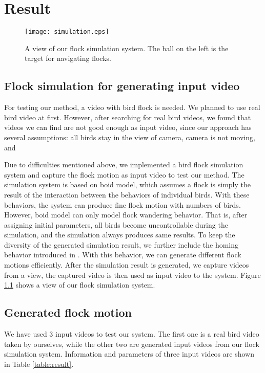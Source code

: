 \chapter{Result}


\begin{figure}[h]
 \begin{center}
  \texttt{[image: simulation.eps]}
 \end{center}
 \caption{A view of our flock simulation system. The ball on the left is the target for navigating flocks.}
 \label{figure:simulation}
\end{figure}


\section{Flock simulation for generating input video}


For testing our method, a video with bird flock is needed. We planned to use real bird video at first. However, after searching for real bird videos, we found that videos we can find are not good enough as input video, since our approach has several assumptions: all birds stay in the view of camera, camera is not moving, and 


Due to difficulties mentioned above, we implemented a bird flock simulation system and capture the flock motion as input video to test our method. The simulation system is based on boid model, which assumes a flock is simply the result of the interaction between the behaviors of individual birds. With these behaviors, the system can produce fine flock motion with numbers of birds. However, boid model can only model flock wandering behavior. That is, after assigning initial parameters, all birds become uncontrollable during the simulation, and the simulation always produces same results. To keep the diversity of the generated simulation result, we further include the homing behavior introduced in \cite{Shape,OB1}. With this behavior, we can generate different flock motions efficiently. After the simulation result is generated, we capture videos from a view, the captured video is then used as input video to the system. Figure \ref{figure:simulation} shows a view of our flock simulation system.


\section{Generated flock motion}


We have used 3 input videos to test our system. The first one is a real bird video taken by ourselves, while the other two are generated input videos from our flock simulation system.  Information and parameters of three input videos are shown in Table \ref{table:result}.


